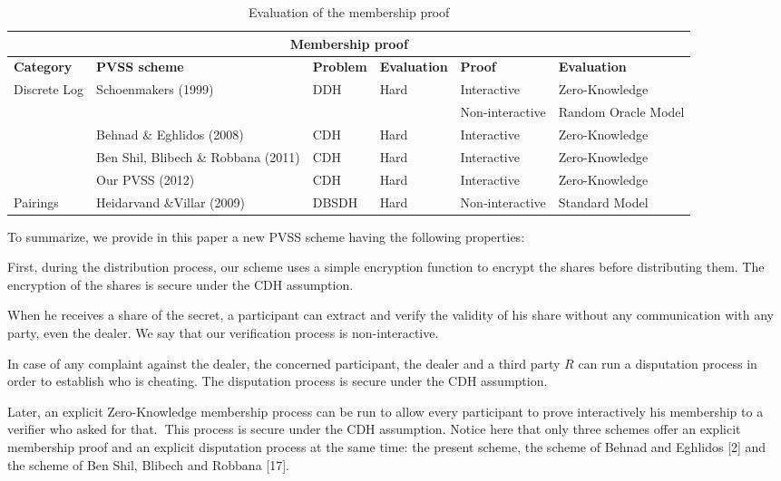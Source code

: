 \documentclass[submission,copyright,creativecommons]{eptcs}
\begin{document}
\begin{table*}[tbp] \centering \begin{tabular}{|p{1.9cm}||p{3.2cm}||p{1.5cm}||p{1.7cm}||p{1.5cm}||p{1.7cm}|}
\hline
\multicolumn{6}{|c|}{\textbf{Membership proof}} \\ \hline
\textbf{Category} & \textbf{PVSS scheme} & \textbf{Problem} & \textbf{Evaluation} & \textbf{Proof} & \textbf{Evaluation} \\ \hline
\multirow{4}{*}{Discrete Log} & \multirow{2}{*}{Schoenmakers (1999)} & \multirow{2}{*}{DDH} & \multirow{2}{*}{Hard} & Interactive & Zero-Knowledge \\ \cline{5-6}
&  &  &  & Non-interactive & Random Oracle Model \\ \cline{2-6}\cline{5-6}
& Behnad \& Eghlidos (2008) & CDH & Hard & Interactive & Zero-Knowledge \\ 
\cline{2-6}
& Ben Shil, Blibech \& Robbana (2011) & CDH & Hard & Interactive & 
Zero-Knowledge \\ \cline{2-6}
& Our PVSS (2012) & CDH & Hard & Interactive & Zero-Knowledge \\ \hline
\multirow{1}{*}{Pairings} & Heidarvand \&Villar (2009) & DBSDH & Hard & 
Non-interactive & Standard Model \\ \hline
\end{tabular}\caption{Evaluation of the membership proof}\label{Evaluation of the
membership proof}\end{table*}To summarize, we provide in this paper a new PVSS scheme having the
following properties:

First, during the distribution process, our scheme uses a simple encryption
function to encrypt the shares before distributing them. The encryption of
the shares is secure under the CDH assumption.

When he receives a share of the secret, a participant can extract and verify
the validity of his share without any communication with any party, even the
dealer. We say that our verification process is non-interactive.

In case of any complaint against the dealer, the concerned participant, the
dealer and a third party $R$ can run a disputation process in order to
establish who is cheating. The disputation process is secure under the CDH
assumption.

Later, an explicit Zero-Knowledge membership process can be run to allow
every participant to prove interactively his membership to a verifier who
asked for that.\textbf{\ }This process is secure under the CDH assumption. Notice here that only three schemes offer an explicit membership proof and an explicit disputation process at the same time: the present scheme, the
scheme of Behnad and Eghlidos [2] and the scheme of Ben Shil, Blibech and
Robbana [17].
\end{document}
